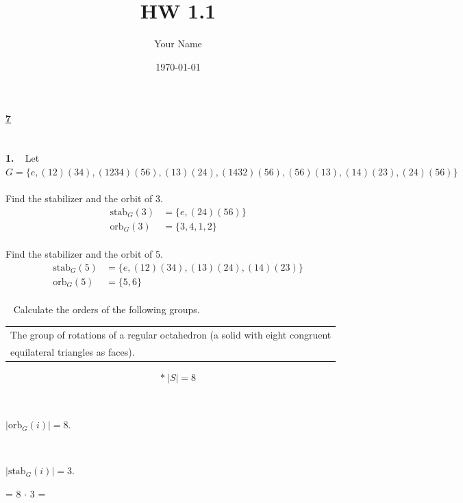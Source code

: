 \documentclass[12pt, letterpaper]{article}
\title{HW 1.1}
\author{Your Name}
\date{\today}
\begin{document}
 
\paragraph{\underline{7} \\ \\}
\textbf{1.} \  Let $G = \{e, (12)(34), (1234)(56), (13)(24), (1432)(56), (56)(13), (14)(23),(24)(56) \}$ \\ \\
\vspace{0.2em}
\qquad \qquad {} Find the stabilizer and the orbit of $3$.
\[
\boxed{
\begin{aligned}
    \text{stab}_{G}(3) &= \{e, (24)(56) \} \\
    \text{orb}_{G}(3) &= \{3, 4, 1, 2\}
\end{aligned}
}
\] \\
\vspace{0.2em}
\qquad \qquad {} Find the stabilizer and the orbit of 5.
\[
\boxed{
\begin{aligned}
    \text{stab}_{G}(5) &= \{e, (12)(34), (13)(24), (14)(23)\} \\
    \text{orb}_{G}(5) &= \{5, 6\}
\end{aligned}
}
\] \\
\vspace{0.2em}
\qquad \  Calculate the orders of the following groups. \\  \vspace{0.2em}
\qquad \qquad {} \begin{tabular}[t]{l} 
    The group of rotations of a regular octahedron 
    (a solid with eight congruent \\ 
    equilateral triangles as faces). \end{tabular}
    \begin{align*}
        * \ |S| = 8 
    \end{align*} 
    \begin{center}
     \\
    \begin{center}
        $|\text{orb}_G(i)| = 8$.
    \end{center}  
     \\
    \begin{center}
        $|\text{stab}_{G}(i)| = 3$.
    \end{center}
     = 8 $\cdot$ 3  =  
    \end{center} \\ \vspace{0.2em}
\end{document}
